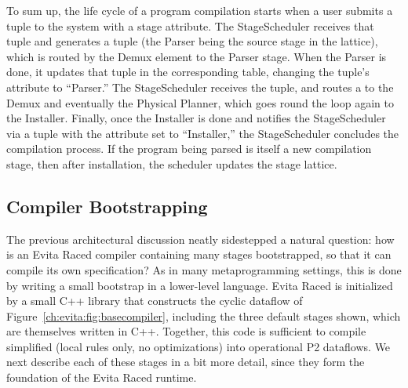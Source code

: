 To sum up, the life cycle of a program compilation starts when a user
submits a  tuple to the system with a  stage
attribute. The StageScheduler receives that  tuple and
generates a
 tuple (the Parser being the source stage in the
lattice), which is routed by the Demux element to
the Parser stage. When the Parser is done, it updates that  tuple
in the corresponding table, changing the tuple's attribute to
``Parser.''  The StageScheduler receives the  tuple, and routes a
 to the Demux and eventually the Physical Planner, which goes round the loop again to the
Installer.  Finally, once the Installer is done and notifies the
StageScheduler via a  tuple with the  attribute set to
``Installer,'' the StageScheduler concludes the compilation process.
If the \OVERLOG program being parsed is itself a new compilation stage, then after
installation, the scheduler updates the stage lattice.


\subsection{Compiler Bootstrapping}
\label{ch:evita:sec:bootstrap}
The previous architectural discussion neatly sidestepped a natural question: how is an Evita Raced compiler containing many \OVERLOG stages bootstrapped, so that it can compile its own \OVERLOG specification?
As in many metaprogramming settings, this is done by writing a small bootstrap  in a lower-level language. Evita Raced is initialized by a small C++ library that constructs the cyclic dataflow of Figure~\ref{ch:evita:fig:basecompiler}, including the three default stages shown, which are themselves written in C++. %
Together, this code is sufficient
to compile simplified \OVERLOG (local rules only, no optimizations) into
operational P2 dataflows. We next describe each of these stages in a bit
more detail, since they form the foundation of the Evita Raced runtime.


